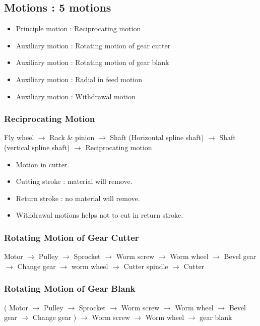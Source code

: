 \documentclass{article}
\begin{document}
\begin{multicols}{2}
  \subsection{Motions : 5 motions} 
  \begin{itemize}
    \item Principle motion : Reciprocating motion 
    \item Auxiliary motion : Rotating motion of gear cutter
    \item Auxiliary motion : Rotating motion of gear blank 
    \item Auxiliary motion : Radial in feed motion 
    \item Auxiliary motion : Withdrawal motion 
  \end{itemize}
  
  \subsubsection{Reciprocating Motion}
  Fly wheel $\rightarrow$ Rack \& pinion $\rightarrow$ Shaft (Horizontal spline shaft) $\rightarrow$ Shaft (vertical spline shaft) $\rightarrow$ Reciprocating motion 
  
  \begin{itemize}
    \item Motion in cutter.
    \item Cutting stroke : material will remove.
    \item Return stroke : no material will remove.
    \item Withdrawal motions helps not to cut in return stroke. 
  \end{itemize}
  
  \subsubsection{Rotating Motion of Gear Cutter}
  Motor $\rightarrow$ Pulley $\rightarrow$ Sprocket $\rightarrow$ Worm screw $\rightarrow$ Worm wheel $\rightarrow$ Bevel gear $\rightarrow$ Change gear $\rightarrow$ worm wheel $\rightarrow$ Cutter spindle $\rightarrow$ Cutter
  
  \subsubsection{Rotating Motion of Gear Blank}
  ( Motor $\rightarrow$ Pulley $\rightarrow$ Sprocket $\rightarrow$ Worm screw $\rightarrow$ Worm wheel $\rightarrow$ Bevel gear $\rightarrow$ Change gear ) $\rightarrow$ Worm screw $\rightarrow$ Worm wheel $\rightarrow$ gear blank 
  

\end{multicols}
\end{document}
